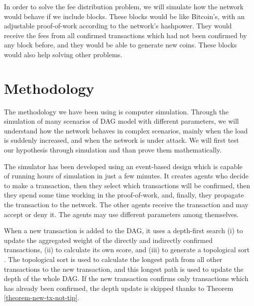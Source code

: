 In order to solve the fee distribution problem, we will simulate how the network would behave if we include blocks. These blocks would be like Bitcoin's, with an adjustable proof-of-work according to the network's hashpower. They would receive the fees from all confirmed transactions which had not been confirmed by any block before, and they would be able to generate new coins. These blocks would also help solving other problems.


\chapter{Methodology}

The methodology we have been using is computer simulation. Through the simulation of many scenarios of DAG model with different parameters, we will understand how the network behaves in complex scenarios, mainly when the load is suddenly increased, and when the network is under attack. We will first test our hypothesis through simulation and than prove them mathematically.

The simulator has been developed using an event-based design which is capable of running hours of simulation in just a few minutes. It creates agents who decide to make a transaction, then they select which transactions will be confirmed, then they spend some time working in the proof-of-work, and, finally, they propagate the transaction to the network. The other agents receive the transaction and may accept or deny it. The agents may use different parameters among themselves.

When a new transaction is added to the DAG, it uses a depth-first search \citep{cormen2009introduction} (i) to update the aggregated weight of the directly and indirectly confirmed transactions, (ii) to calculate its own score, and (iii) to generate a topological sort \citep{cormen2009introduction}. The topological sort is used to calculate the longest path from all other transactions to the new transaction, and this longest path is used to update the depth of the whole DAG. If the new transaction confirms only transactions which has already been confirmed, the depth update is skipped thanks to Theorem \ref{theorem-new-tx-not-tip}.


